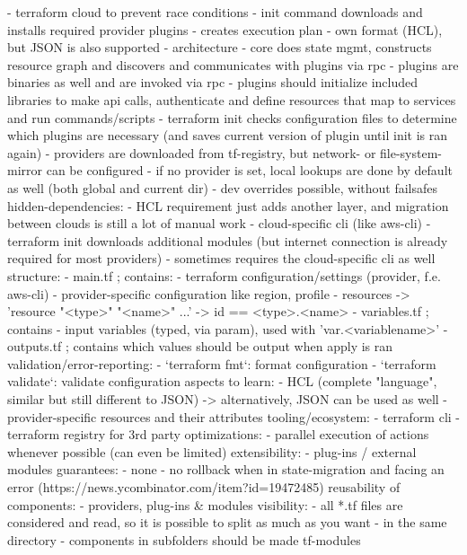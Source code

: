     - terraform cloud to prevent race conditions
    - init command downloads and installs required provider plugins
    - creates execution plan
    - own format (HCL), but JSON is also supported
    - architecture
      - core does state mgmt, constructs resource graph and discovers and communicates with plugins via rpc
      - plugins are binaries as well and are invoked via rpc
      - plugins should initialize included libraries to make api calls, authenticate and define resources that map to services and run commands/scripts
      - terraform init checks configuration files to determine which plugins are necessary (and saves current version of plugin until init is ran again)
      - providers are downloaded from tf-registry, but network- or file-system-mirror can be configured
      - if no provider is set, local lookups are done by default as well (both global and current dir)
      - dev overrides possible, without failsafes
  hidden-dependencies:
    - HCL requirement just adds another layer, and migration between clouds is still a lot of manual work
    - cloud-specific cli (like aws-cli)
    - terraform init downloads additional modules (but internet connection is already required for most providers)
    - sometimes requires the cloud-specific cli as well
  structure:
    - main.tf ; contains:
      - terraform configuration/settings (provider, f.e. aws-cli)
      - provider-specific configuration like region, profile
      - resources -> 'resource "<type>" "<name>" {...}' -> id == <type>.<name>
    - variables.tf ; contains
      - input variables (typed, via param), used with 'var.<variablename>'
    - outputs.tf ; contains which values should be output when apply is ran
  validation/error-reporting:
    - `terraform fmt`: format configuration
    - `terraform validate`: validate configuration
  aspects to learn:
    - HCL (complete "language", similar but still different to JSON) -> alternatively, JSON can be used as well
    - provider-specific resources and their attributes
  tooling/ecosystem:
    - terraform cli
    - terraform registry for 3rd party
  optimizations:
    - parallel execution of actions whenever possible (can even be limited)
  extensibility:
    - plug-ins / external modules
  guarantees:
    - none - no rollback when in state-migration and facing an error (https://news.ycombinator.com/item?id=19472485)
  reusability of components:
    - providers, plug-ins & modules
  visibility:
    - all *.tf files are considered and read, so it is possible to split as much as you want - in the same directory
    - components in subfolders should be made tf-modules
